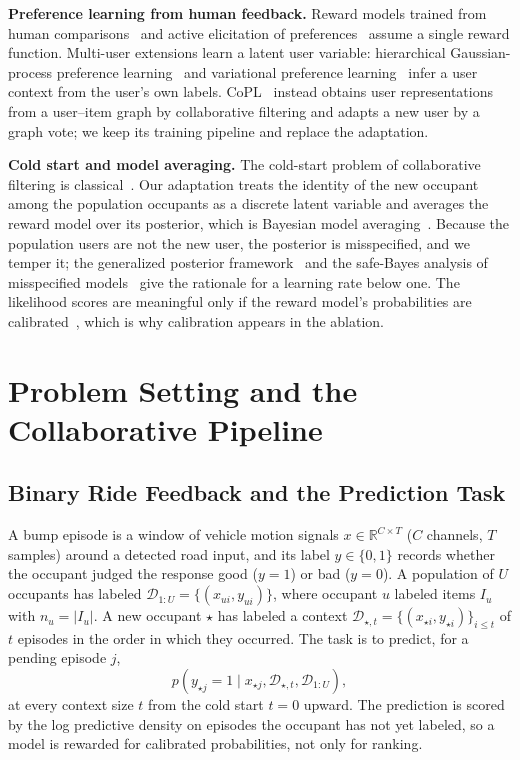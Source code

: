 \documentclass[conference]{IEEEtran}
\newcommand{\R}{\mathbb{R}}
\newcommand{\D}{\mathcal{D}}
\newcommand{\newuser}{\star}
\begin{document}
\textbf{Preference learning from human feedback.} Reward models trained from human comparisons~\cite{christiano2017deep} and active elicitation of preferences~\cite{sadigh2017active} assume a single reward function. Multi-user extensions learn a latent user variable: hierarchical Gaussian-process preference learning~\cite{birlutiu2013efficiently} and variational preference learning~\cite{poddar2024vpl} infer a user context from the user's own labels. CoPL~\cite{choi2025copl} instead obtains user representations from a user--item graph by collaborative filtering and adapts a new user by a graph vote; we keep its training pipeline and replace the adaptation.

\textbf{Cold start and model averaging.} The cold-start problem of collaborative filtering is classical~\cite{schein2002coldstart,koren2009matrix}. Our adaptation treats the identity of the new occupant among the population occupants as a discrete latent variable and averages the reward model over its posterior, which is Bayesian model averaging~\cite{hoeting1999bma}. Because the population users are not the new user, the posterior is misspecified, and we temper it; the generalized posterior framework~\cite{bissiri2016general} and the safe-Bayes analysis of misspecified models~\cite{grunwald2017inconsistency} give the rationale for a learning rate below one. The likelihood scores are meaningful only if the reward model's probabilities are calibrated~\cite{guo2017calibration,vancalster2019calibration}, which is why calibration appears in the ablation.

\section{Problem Setting and the Collaborative Pipeline}
\label{sec:pipeline}

\subsection{Binary Ride Feedback and the Prediction Task}
\label{sec:setting}

A bump episode is a window of vehicle motion signals $x\in\R^{C\times T}$ ($C$ channels, $T$ samples) around a detected road input, and its label $y\in\{0,1\}$ records whether the occupant judged the response good ($y=1$) or bad ($y=0$). A population of $U$ occupants has labeled $\D_{1:U}=\{(x_{ui},y_{ui})\}$, where occupant $u$ labeled items $I_u$ with $n_u=|I_u|$. A new occupant $\newuser$ has labeled a context $\D_{\newuser,t}=\{(x_{\newuser i},y_{\newuser i})\}_{i\le t}$ of $t$ episodes in the order in which they occurred. The task is to predict, for a pending episode $j$,
\begin{equation}
 p(y_{\newuser j}=1\mid x_{\newuser j},\D_{\newuser,t},\D_{1:U}),
 \label{eq:target}
\end{equation}
at every context size $t$ from the cold start $t=0$ upward. The prediction is scored by the log predictive density on episodes the occupant has not yet labeled, so a model is rewarded for calibrated probabilities, not only for ranking.
\end{document}
